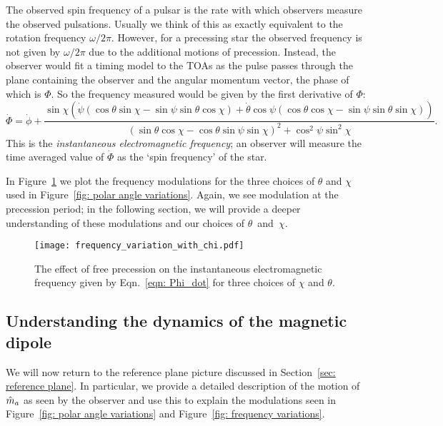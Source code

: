 \documentclass[../full_thesis/full_thesis.tex]{subfiles}
\begin{document}
The observed spin frequency of a pulsar is the rate with which observers measure the
observed pulsations. Usually we think of this as exactly equivalent to the
rotation frequency $\omega/2\pi$. However, for a precessing star the observed
frequency is not given by $\omega/2\pi$ due to the additional motions of precession.
Instead, the observer would fit a timing model to the TOAs as the
pulse passes through the plane containing the observer and the angular momentum vector,
the phase of which is $\Phi$. So the frequency measured would be given by the
first derivative of $\Phi$:
\begin{equation}
\dot{\Phi} = \dot{\phi}
+ \frac{\sin\chi \left(
\dot{\psi} (\cos\theta\sin\chi - \sin \psi \sin \theta \cos\chi) +
\dot{\theta} \cos\psi (\cos\theta\cos\chi - \sin \psi \sin \theta \sin\chi)\right)
}{(\sin\theta \cos \chi - \cos \theta \sin \psi \sin \chi)^{2} + \cos^{2}\psi \sin^{2} \chi}.
\label{eqn: Phi_dot}
\end{equation}
This is the \emph{instantaneous electromagnetic frequency}; an observer
will measure the time averaged value of $\dot{\Phi}$ as the `spin frequency' of
the star.

In Figure~\ref{fig: frequency variations} we plot the frequency modulations for
the three choices of $\theta$ and $\chi$ used in Figure~\ref{fig: polar angle variations}.
Again, we see modulation at the precession period; in the following section, we
will provide a deeper understanding of these modulations and our choices of
$\theta$~and~$\chi$.
\begin{figure}[htb]
\centering
  \texttt{[image: frequency\_variation\_with\_chi.pdf]}
\caption{The effect of free precession on the instantaneous electromagnetic
frequency given by Eqn.~\eqref{eqn: Phi_dot} for three choices of $\chi$ and
$\theta$.}
\label{fig: frequency variations}
\end{figure}


\subsection{Understanding the dynamics of the magnetic dipole}
\label{sec: understanding the motion of m}

We will now return to the reference plane picture discussed in Section~\ref{sec:
reference plane}. In particular, we provide a detailed description of
the motion of $\hat{m}_a$ as seen by the observer and use this to explain the
modulations seen in Figure~\ref{fig: polar angle variations} and Figure~\ref{fig:
frequency variations}.
\end{document}
